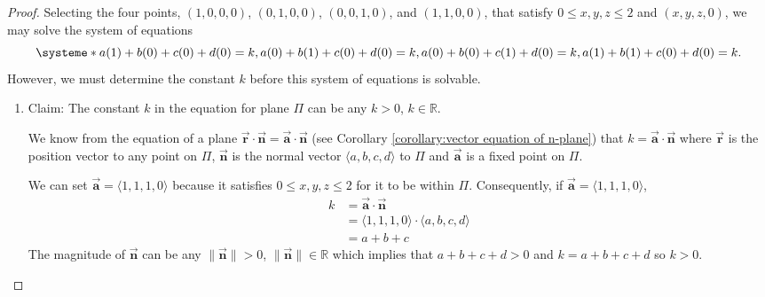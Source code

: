 \begin{proof}
    Selecting the four points, $(1,0,0,0)$, $(0,1,0,0)$, $(0,0,1,0)$, and $(1,1,0,0)$, that satisfy $0\leq x, y, z \leq 2$ and $(x, y, z, 0)$, we may solve the system of equations
    \begin{equation*}
        \systeme*{
        a(1)+b(0)+c(0)+d(0)=k,
        a(0)+b(1)+c(0)+d(0)=k,
        a(0)+b(0)+c(1)+d(0)=k,
        a(1)+b(1)+c(0)+d(0)=k.
        }
    \end{equation*}
    However, we must determine the constant $k$ before this system of equations is solvable. 
    \begin{enumerate}
            \item Claim: The constant $k$ in the equation for plane $\Pi$ can be any $k > 0$, $k \in \mathbb{R}$.
            \begin{subproof}[Subproof]
                We know from the equation of a plane  $\Vec{\mathbf{r}} \cdot \Vec{\mathbf{n}} = \Vec{\mathbf{a}} \cdot \Vec{\mathbf{n}}$ (see Corollary \ref{corollary:vector equation of n-plane}) that \(k=\Vec{\mathbf{a}} \cdot\Vec{\mathbf{n}}\) where $\Vec{\mathbf{r}}$ is the position vector to any point on $\Pi$, $\Vec{\mathbf{n}}$ is the normal vector $\langle a, b, c, d \rangle$ to $\Pi$ and $\Vec{\mathbf{a}}$ is a fixed point on $\Pi$.
                
                \noindent
                We can set $\Vec{\mathbf{a}} = \langle 1, 1, 1, 0 \rangle$ because it satisfies $0\leq x, y, z \leq 2$ for it to be within $\Pi$. Consequently, if $\Vec{\mathbf{a}} = \langle 1, 1, 1, 0 \rangle$,
                \begin{align*}
                    k &= \Vec{\mathbf{a}} \cdot\Vec{\mathbf{n}}\\
                      &= \langle 1, 1, 1, 0\rangle \cdot \langle a, b, c, d\rangle\\
                      &= a + b + c
                \end{align*}
                The magnitude of $\Vec{\mathbf{n}}$ can be any $ \lVert\Vec{\mathbf{n}}\rVert > 0$, $\lVert\Vec{\mathbf{n}}\rVert\in \mathbb{R}$ which implies that $a+b+c+d > 0$ and $k = a+b+c+d$ so $k>0$.
            \end{subproof}
    \end{enumerate}
    

\end{proof}
